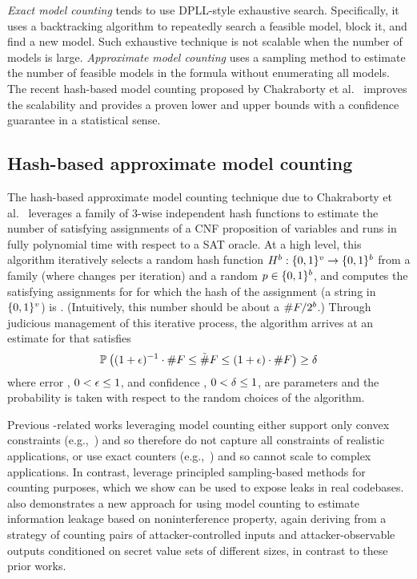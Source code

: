 \textit{Exact model counting} tends to use DPLL-style exhaustive
search. Specifically, it uses a backtracking algorithm to repeatedly
search a feasible model, block it, and find a new model.  Such
exhaustive technique is not scalable when the number of models is
large. \textit{Approximate model counting} uses a sampling method to
estimate the number of feasible models in the formula without
enumerating all models. The recent hash-based model counting proposed
by Chakraborty et al.~\cite{Chakraborty:2013:SAM:2961240.2961265}
improves the scalability and provides a proven lower and upper bounds
with a confidence guarantee in a statistical sense. 

\subsection{Hash-based approximate model counting}
\label{sec:related:qif:approxcount}
The hash-based approximate model counting technique due to Chakraborty
et al.~\cite{Chakraborty:2013:SAM:2961240.2961265} leverages a family
of $3$-wise independent hash functions to estimate the number
\satCount{\satProp} of satisfying assignments of a \gls{CNF}
proposition \satProp of \satVars variables and runs in fully
polynomial time with respect to a SAT oracle.  At a high level, this
algorithm iteratively selects a random hash function
$H^{b}: \{0,1\}^{v}
\rightarrow \{0,1\}^{b}$ from a family (where
\hashFnOutputPrefixBits changes per iteration) and a random
$p \in \{0,1\}^{b}$, and
computes the satisfying assignments for \satProp for which the hash of
the assignment (a string in $\{0,1\}^{v}$) is
\hashFnOutputPrefix.  (Intuitively, this number should be about a
$\#{F}/2^{b}$.)  Through judicious
management of this iterative process, the algorithm arrives at an
estimate \satCountEstimate{\satProp} for \satCount{\satProp} that
satisfies  \[ \mathbb{P}_{}\left({(1+\epsilon)^{-1}\cdot\#{F} \le
\tilde{\#}{F} \le (1+\epsilon)\cdot\#{F}}\right)
\ge \delta \]  where error \error, $0 < \epsilon \le 1$, and
confidence \confidence, $0 < \delta \le 1$, are parameters and
the probability is taken with respect to the random choices of the
algorithm. 

Previous \QIF-related works leveraging model counting either support
only convex constraints
(e.g.,~\cite{Backes:2009:ADQ:1607723.1608130,cryptoeprint:2017:401})
and so therefore do not capture all constraints of realistic
applications, or use exact counters
(e.g.,~\cite{Phan:2014:AMC:2590296.2590328}) and so cannot scale to
complex applications.  In contrast,  leverage
principled sampling-based methods for counting purposes, which we show
can be used to expose leaks in real codebases.  
also demonstrates a new approach for using model counting to estimate
information leakage based on noninterference property, again deriving
from a strategy of counting pairs of attacker-controlled inputs and
attacker-observable outputs conditioned on secret value sets of
different sizes, in contrast to these prior works. 

